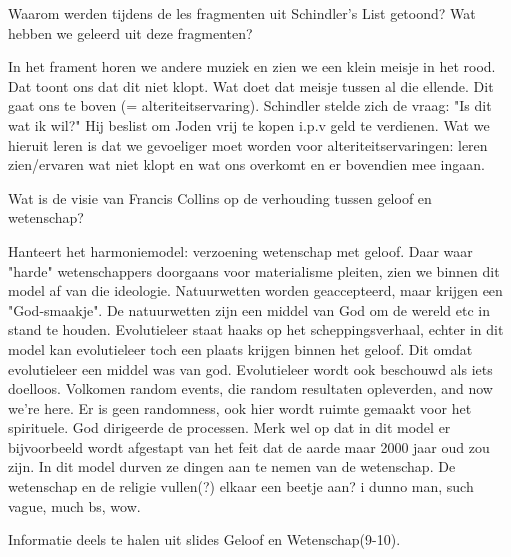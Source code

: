 \documentclass[main.tex]{subfiles}
\begin{document}
\begin{examenvraag}
    \begin{vraag}
        Waarom werden tijdens de les fragmenten uit Schindler’s List getoond? Wat hebben we geleerd uit deze fragmenten?
    \end{vraag}

    \begin{antwoord}
		In het frament horen we andere muziek en zien we een klein meisje in het rood. Dat toont ons dat dit niet klopt. Wat doet dat meisje tussen al die ellende. Dit gaat ons te boven (= alteriteitservaring). Schindler stelde zich de vraag: "Is dit wat ik wil?" Hij beslist om Joden vrij te kopen i.p.v geld te verdienen. Wat we hieruit leren is dat we gevoeliger moet worden voor alteriteitservaringen: leren zien/ervaren wat niet klopt en wat ons overkomt en er bovendien mee ingaan.
    \end{antwoord}
\end{examenvraag}


\begin{examenvraag}
    \begin{vraag}
        Wat is de visie van Francis Collins op de verhouding tussen geloof en wetenschap?
    \end{vraag}			
    			
    \begin{antwoord}
    	Hanteert het harmoniemodel: verzoening wetenschap met geloof.
    	Daar waar "harde" wetenschappers doorgaans voor materialisme pleiten, zien we binnen dit model af van die ideologie. 
    	Natuurwetten worden geaccepteerd, maar krijgen een "God-smaakje". De natuurwetten zijn een middel van God om de wereld etc in stand te houden. 
    	Evolutieleer staat haaks op het scheppingsverhaal, echter in dit model kan evolutieleer toch een plaats krijgen binnen het geloof.
    	Dit omdat evolutieleer een middel was van god.
    	Evolutieleer wordt ook beschouwd als iets doelloos. Volkomen random events, die random resultaten opleverden,  and now we're here. 
    	Er is geen randomness, ook hier wordt ruimte gemaakt voor het spirituele. 
    	God dirigeerde de processen.
    	Merk wel op dat in dit model er bijvoorbeeld wordt afgestapt van het feit dat de aarde maar 2000 jaar oud zou zijn. 
    	In dit model durven ze dingen aan te nemen van de wetenschap.
    	De wetenschap en de religie vullen(?) elkaar een beetje aan? i dunno man, such vague, much bs,  wow.
    	
    	Informatie deels te halen uit slides Geloof en Wetenschap(9-10).
    	
    \end{antwoord}
\end{examenvraag}
\end{document}
